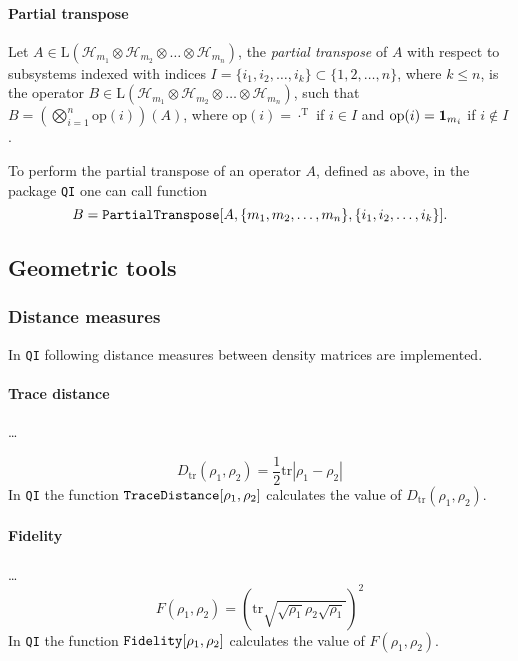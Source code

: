 \documentclass[11pt,a4paper]{article}
\newcommand{\qi}{\texttt{QI}}
\newcommand{\Hilb}[1]{\mathcal{H}_{#1}}
\newcommand{\Lin}{\mathrm{L}}
\newcommand{\tr}{\mathrm{tr}}
\newcommand{\1}{{\bf 1}}
\newcommand{\fname}[1]{\text{\texttt{#1}}}
\begin{document}
\paragraph{Partial transpose}
Let $A\in \Lin(\Hilb{m_1}\otimes \Hilb{m_2}\otimes \ldots \otimes \Hilb{m_n})$,
the \emph{partial transpose} of $A$ with respect to subsystems indexed with 
indices $I=\{i_1, i_2, \ldots, i_k\}\subset \{1,2,\ldots, n\}$, where $k\leq 
n$, is the operator $B\in \Lin(\Hilb{m_1}\otimes \Hilb{m_2}\otimes \ldots 
\otimes \Hilb{m_n})$, such that $B=(\bigotimes_{i=1}^{n} \mathrm{op}(i))(A)$, 
where $\mathrm{op}(i)=\cdot^{\mathrm T}$ if $i\in I$ and 
$\mathrm{op}(i)=\1_{m_i}$ if $i\notin I$.

To perform the partial transpose of an operator $A$, defined as above, in the 
package \qi{} one can call function
\begin{equation}
B=\fname{PartialTranspose}[A, \{m_1, m_2, \ldots, m_n\}, \{i_1, i_2, 
\ldots, i_k\}].
\end{equation} 

\subsection{Geometric tools}

\subsubsection{Distance measures}
In \qi{} following distance measures between density matrices are implemented.
\paragraph{Trace distance} \ldots 

\begin{equation}
D_{\tr}(\rho_1,\rho_2)=\frac12\tr|\rho_1-\rho_2|
\end{equation}
In \qi{} the function $\fname{TraceDistance}[\rho_1,\rho_2]$ calculates the 
value of $D_{\tr}(\rho_1,\rho_2)$.

\paragraph{Fidelity}  \ldots
\begin{equation}
F(\rho_1,\rho_2)=
\left(\tr\sqrt{\sqrt{\rho_1}\rho_2\sqrt{\rho_1}}\right)^2
\end{equation}
In \qi{} the function $\fname{Fidelity}[\rho_1,\rho_2]$ calculates the 
value of $F(\rho_1,\rho_2)$.
\end{document}
